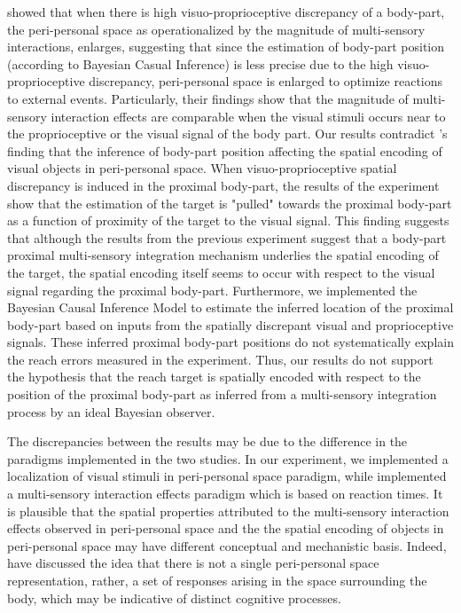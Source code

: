  showed that when there is high visuo-proprioceptive discrepancy of a body-part, the peri-personal space as operationalized by the magnitude of multi-sensory interactions, enlarges, suggesting that since the estimation of body-part position (according to Bayesian Casual Inference) is less precise due to the high visuo-proprioceptive discrepancy, peri-personal space is enlarged to optimize reactions to external events. Particularly, their findings show that the magnitude of multi-sensory interaction effects are comparable when the visual stimuli occurs near to the proprioceptive or the visual signal of the body part. Our results contradict 's finding that the inference of body-part position affecting the spatial encoding of visual objects in peri-personal space. When visuo-proprioceptive spatial discrepancy is induced in the proximal body-part, the results of the experiment show that the estimation of the target is "pulled" towards the proximal body-part as a function of proximity of the target to the visual signal. This finding suggests that although the results from the previous experiment suggest that a body-part proximal multi-sensory integration mechanism underlies the spatial encoding of the target, the spatial encoding itself seems to occur with respect to the visual signal regarding the proximal body-part. Furthermore, we implemented the Bayesian Causal Inference Model to estimate the inferred location of the proximal body-part based on inputs from the spatially discrepant visual and proprioceptive signals. These inferred proximal body-part positions do not systematically explain the reach errors measured in the experiment. Thus, our results do not support the hypothesis that the reach target is spatially encoded with respect to the position of the proximal body-part as inferred from a multi-sensory integration process by an ideal Bayesian observer. 

The discrepancies between the results may be due to the difference in the paradigms implemented in the two studies. In our experiment, we implemented a localization of visual stimuli in peri-personal space paradigm, while  implemented a multi-sensory interaction effects paradigm which is based on reaction times. It is plausible that the spatial properties attributed to the multi-sensory interaction effects observed in peri-personal space and the the spatial encoding of objects in peri-personal space may have different conceptual and mechanistic basis. Indeed,  have discussed the idea that there is not a single peri-personal space representation, rather, a set of responses arising in the space surrounding the body, which may be indicative of distinct cognitive processes. 

